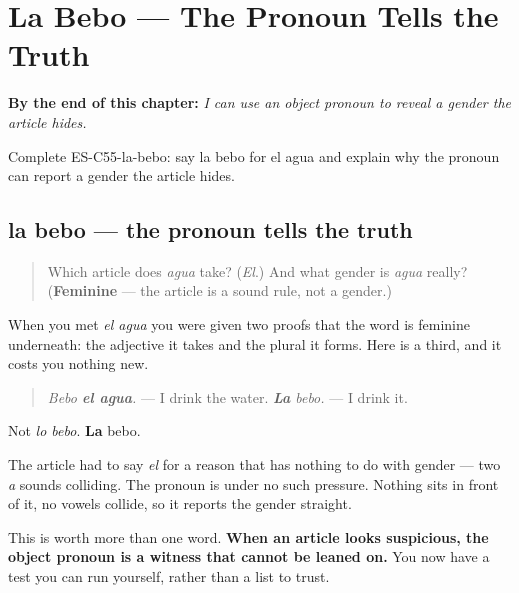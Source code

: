 
\chapter{La Bebo --- The Pronoun Tells the Truth}
\label{ch:pronoun-evidence}

\begin{chapteropening}
\textbf{By the end of this chapter:} \emph{I can use an object pronoun to reveal a gender the article hides.}

Complete ES-C55-la-bebo: say la bebo for el agua and explain why the pronoun can report a gender the article hides.
\end{chapteropening}

\section[la bebo]{la bebo — the pronoun tells the truth}

\label{lesson:ES-C55-la-bebo}



\begin{quote}
Which article does \emph{agua} take? (\emph{El}.) And what gender is \emph{agua} really? (\textbf{Feminine} — the article is a sound rule, not a gender.)
\end{quote}

\begin{grammarlens}[title={Grammar Lens: a third witness}]
When you met \emph{el agua} you were given two proofs that the word is feminine underneath: the adjective it takes and the plural it forms. Here is a third, and it costs you nothing new.

\begin{quote}
\emph{Bebo \textbf{el agua}.} — I drink the water. \emph{\textbf{La} bebo.} — I drink it.
\end{quote}

Not \emph{lo bebo}. \textbf{La} bebo.

The article had to say \emph{el} for a reason that has nothing to do with gender — two \emph{a} sounds colliding. The pronoun is under no such pressure. Nothing sits in front of it, no vowels collide, so it reports the gender straight.

This is worth more than one word. \textbf{When an article looks suspicious, the object pronoun is a witness that cannot be leaned on.} You now have a test you can run yourself, rather than a list to trust.
\end{grammarlens}

